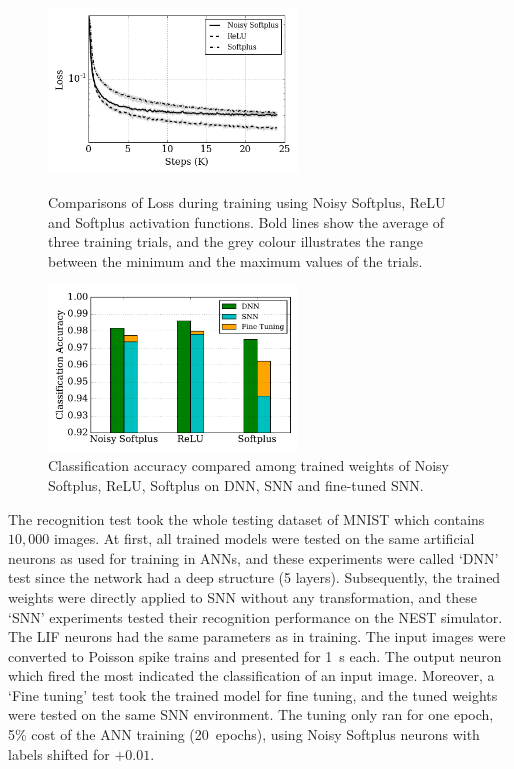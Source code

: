 \documentclass{article}
\begin{document}
\begin{figure}
	\begin{minipage}[t]{0.48\linewidth}
		\raggedleft
		\includegraphics[width=2.6in]{pics_iconip/8.png}
		\caption{Comparisons of Loss during training using Noisy Softplus, ReLU and Softplus activation functions. Bold lines show the average of three training trials, and the grey colour illustrates the range between the minimum and the maximum values of the trials. }
		\label{Fig:loss_ns}
	\end{minipage}%
    \hspace{0.04\linewidth}
	\begin{minipage}[t]{0.48\linewidth}
		\raggedright
		\includegraphics[width=2.6in]{pics_iconip/9-2.pdf}
		\caption{Classification accuracy compared among trained weights of Noisy Softplus, ReLU, Softplus on DNN, SNN and fine-tuned SNN.}
		\label{Fig:result_bar}
	\end{minipage}
\end{figure}

The recognition test took the whole testing dataset of MNIST which contains $10,000$ images.
At first, all trained models were tested on the same artificial neurons as used for training in ANNs, and these experiments were called `DNN' test since the network had a deep structure (5 layers).
Subsequently, the trained weights were directly applied to SNN without any transformation, and these `SNN' experiments tested their recognition performance on the NEST simulator.
The LIF neurons had the same parameters as in training.
The input images were converted to Poisson spike trains and presented for 1~s each.
The output neuron which fired the most indicated the classification of an input image.
Moreover, a `Fine tuning' test took the trained model for fine tuning, and the tuned weights were tested on the same SNN environment.
The tuning only ran for one epoch, 5\% cost of the ANN training (20~epochs), using Noisy Softplus neurons with labels shifted for $+0.01$.
\end{document}
